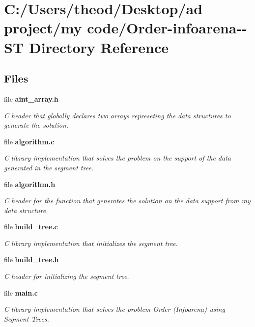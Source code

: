 \section{C\+:/\+Users/theod/\+Desktop/ad project/my code/\+Order-\/infoarena-\/-\/\+ST Directory Reference}
\label{dir_8dd9470b3c64a09470b9a6b2be0e46e5}
\subsection*{Files}
\begin{DoxyCompactItemize}
\item 
file \textbf{ aint\+\_\+array.\+h}
\begin{DoxyCompactList}\small\item\em C header that globally declares two arrays represeting the data structures to generate the solution. \end{DoxyCompactList}\item 
file \textbf{ algorithm.\+c}
\begin{DoxyCompactList}\small\item\em C library implementation that solves the problem on the support of the data generated in the segment tree. \end{DoxyCompactList}\item 
file \textbf{ algorithm.\+h}
\begin{DoxyCompactList}\small\item\em C header for the function that generates the solution on the data support from my data structure. \end{DoxyCompactList}\item 
file \textbf{ build\+\_\+tree.\+c}
\begin{DoxyCompactList}\small\item\em C library implementation that initializes the segment tree. \end{DoxyCompactList}\item 
file \textbf{ build\+\_\+tree.\+h}
\begin{DoxyCompactList}\small\item\em C header for initializing the segment tree. \end{DoxyCompactList}\item 
file \textbf{ main.\+c}
\begin{DoxyCompactList}\small\item\em C library implementation that solves the problem Order (Infoarena) using Segment Trees. \end{DoxyCompactList}\item 

\end{DoxyCompactItemize}
